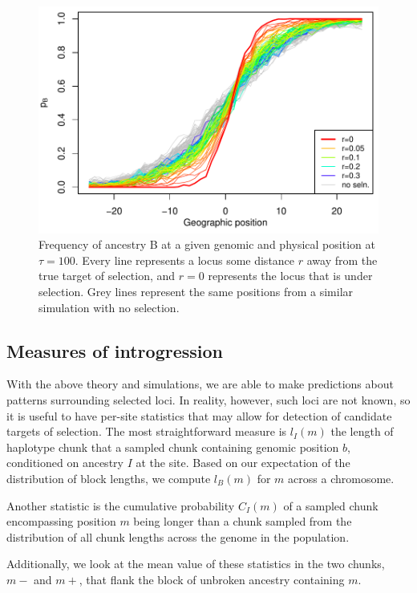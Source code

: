\documentclass[11pt,letterpaper]{article}
\begin{document}
\begin{figure}
\includegraphics{figs/alleleFrequencies_sim}
\caption{Frequency of ancestry B at a given genomic and physical position at $\tau=100$. Every line represents a locus some distance $r$ away from the true target of selection, and $r=0$ represents the locus that is under selection. Grey lines represent the same positions from a similar simulation with no selection.}\label{alleleFreq_tau100}
\end{figure}

\subsection*{Measures of introgression}
With the above theory and simulations, we are able to make predictions about patterns surrounding selected loci. In reality, however, such loci are not known, so it is useful to have per-site statistics that may allow for detection of candidate targets of selection. The most straightforward measure is $l_I(m)$ the length of haplotype chunk that a sampled chunk containing genomic position $b$, conditioned on ancestry $I$ at the site. Based on our expectation of the distribution of block lengths, we compute $l_B(m)$ for $m$ across a chromosome. 

Another statistic is the cumulative probability $C_I(m)$ of a sampled chunk encompassing position $m$ being longer than a chunk sampled from the distribution of all chunk lengths across the genome in the population. 

Additionally, we look at the mean value of these statistics in the two chunks, $m-$ and $m+$, that flank the block of unbroken ancestry containing $m$.
\end{document}
